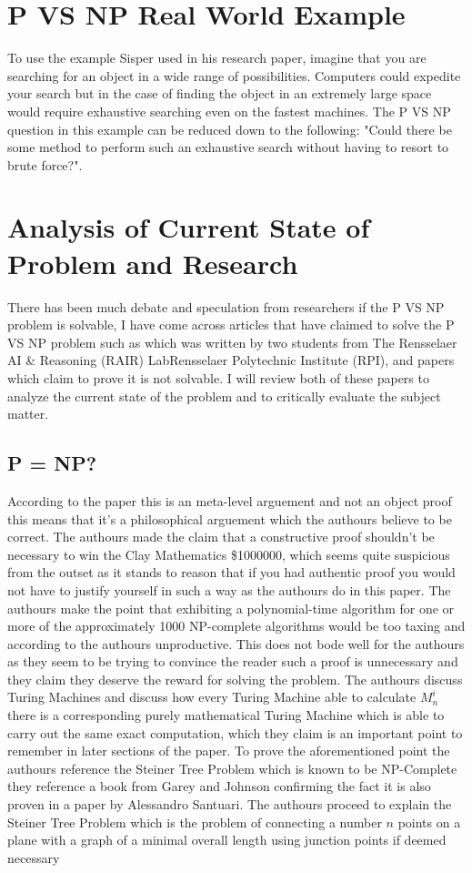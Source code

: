 \documentclass{report}
\begin{document}
\section{P VS NP Real World Example}
To use the example Sisper used in his research paper\cite{HistoryOfPVsNP}, imagine that you are searching for an object in a wide range of possibilities.  Computers could expedite your search but in the case of finding the object in an extremely large space would require exhaustive searching even on the fastest machines.  The P VS NP question in this example can be reduced down to the following: "Could there be some method to perform such an exhaustive search without having to resort to brute force?".
\section{Analysis of Current State of Problem and Research}
There has been much debate and speculation from researchers if the P VS NP problem is solvable, I have come across articles that have claimed to solve the P VS NP problem such as\cite{PVsNPSolved} which was written by two students from The Rensselaer AI \& Reasoning (RAIR) LabRensselaer Polytechnic Institute (RPI), and papers which claim to prove it is not solvable\cite{P!=NP}. I will review both of these papers to analyze the current state of the problem and to critically evaluate the subject matter.
\subsection{P = NP?}
According to the paper this is an meta-level arguement and not an object proof\cite{PVsNPSolved} this means that it's a philosophical arguement which the authours believe to be correct.  The authours made the claim that a constructive proof shouldn't be necessary to win the Clay Mathematics \$1000000\cite{Millennium}, which seems quite suspicious from the outset as it stands to reason that if you had authentic proof you would not have to justify yourself in such a way as the authours do in this paper\cite{PVsNPSolved}.  The authours make the point that exhibiting a polynomial-time algorithm for one or more of the approximately 1000 NP-complete algorithms would be too taxing and according to the authours unproductive\cite{PVsNPSolved}.  This does not bode well for the authours as they seem to be trying to convince the reader such a proof is unnecessary and they claim they deserve the reward for solving the problem\cite{PVsNPSolved}.  The authours discuss Turing Machines and discuss how every Turing Machine able to calculate $M^i_n$ there is a corresponding purely mathematical Turing Machine which is able to carry out the same exact computation, which they claim is an important point to remember in later sections of the paper.  To prove the aforementioned point the authours reference the Steiner Tree Problem which is known to be NP-Complete they reference a book from Garey and Johnson confirming the fact\cite{GaeryJohnson} it is also proven in a paper by Alessandro Santuari\cite{Steiner}.  The authours proceed to explain the Steiner Tree Problem which is the problem of connecting a number $n$ points on a plane with a graph of a minimal overall length using junction points if deemed necessary\cite{Steiner}
\end{document}
